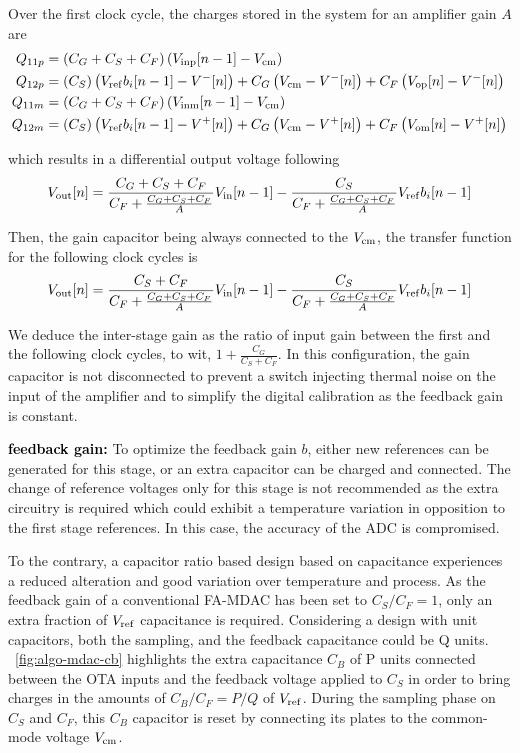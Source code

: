 Over the first clock cycle, the charges stored in the system for an amplifier gain $A$ are
\begin{align}
Q_{11p} &= \left(C_G+C_S+C_F \right) \left( V_{\rm inp}[n-1] - V_{\rm cm} \right)\\
Q_{12p} &= \left(C_S \right) \left( V_{\rm ref}b_i[n-1] - V^{-}[n] \right) + C_G \left(V_{\rm cm}-V^{-}[n] \right)  + C_F \left(V_{\rm op}[n]-V^{-}[n] \right) \\
Q_{11m} &= \left(C_G+C_S+C_F \right) \left( V_{\rm inm}[n-1] - V_{\rm cm} \right) \\
Q_{12m} &= \left(C_S \right) \left( V_{\rm ref}b_i[n-1] - V^{+}[n] \right) + C_G \left(V_{\rm cm}-V^{+}[n] \right)  + C_F \left(V_{\rm om}[n]-V^{+}[n] \right)
\end{align}

which results in a differential output voltage following
\begin{equation}
	V_{\rm out}[n] = \frac{C_G+C_S+C_F}{C_F+\frac{C_G+C_S+C_F}{A}} V_{\rm in}[n-1] - \frac{C_S}{C_F+\frac{C_G+C_S+C_F}{A}} V_{\rm ref}b_i[n-1]
\end{equation}

Then, the gain capacitor being always connected to the $V_{\rm cm}$, the transfer function for the following clock cycles is
\begin{equation}
	V_{\rm out}[n] = \frac{C_S+C_F}{C_F+\frac{C_G+C_S+C_F}{A}} V_{\rm in}[n-1] - \frac{C_S}{C_F+\frac{C_G+C_S+C_F}{A}} V_{\rm ref}b_i[n-1]
\end{equation}

We deduce the inter-stage gain as the ratio of input gain between the first and the following clock cycles, to wit, $1+\frac{C_G}{C_S+C_F}$.  In this configuration, the gain capacitor is not disconnected to prevent a switch injecting thermal noise on the input of the amplifier and to simplify the digital calibration as the feedback gain is constant.

\textbf{\textcolor{black}{feedback gain:}}
To optimize the feedback gain $b$, either new references can be generated for this stage, or an extra capacitor can be charged and connected. The change of reference voltages only for this stage is not recommended as the extra circuitry is required which could exhibit a temperature variation in opposition to the first stage references. In this case, the accuracy of the ADC is compromised.

To the contrary, a capacitor ratio based design based on capacitance experiences a reduced alteration and good variation over temperature and process. As the feedback gain of a conventional FA-MDAC has been set to \(C_S/C_F = 1\), only an extra fraction of \(V_{\rm ref}\) capacitance is required. Considering a design with unit capacitors, both the sampling, and the feedback capacitance could be Q units. \figurename~\ref{fig:algo-mdac-cb} highlights the extra capacitance \(C_B\) of P units connected between the OTA inputs and the feedback voltage applied to \(C_S\) in order to bring charges in the amounts of \(C_B/C_F = P/Q\) of \(V_{\rm ref}\). During the sampling phase on \(C_S\) and \(C_F\), this \(C_B\) capacitor is reset by connecting its plates to the common-mode voltage \(V_{\rm cm}\).

